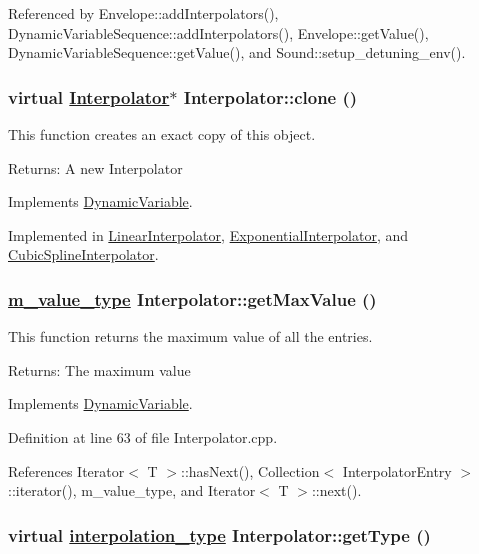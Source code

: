 Referenced by Envelope::add\-Interpolators(), Dynamic\-Variable\-Sequence::add\-Interpolators(), Envelope::get\-Value(), Dynamic\-Variable\-Sequence::get\-Value(), and Sound::setup\_\-detuning\_\-env().\hypertarget{classInterpolator_a1}{
\subsubsection[clone]{\setlength{\rightskip}{0pt plus 5cm}virtual \hyperlink{classInterpolator}{Interpolator}$\ast$ Interpolator::clone ()}}
\label{classInterpolator_a1}


This function creates an exact copy of this object. \begin{Desc}
\item[Returns:]A new Interpolator \end{Desc}


Implements \hyperlink{classDynamicVariable_a2}{Dynamic\-Variable}.

Implemented in \hyperlink{classLinearInterpolator_a1}{Linear\-Interpolator}, \hyperlink{classExponentialInterpolator_a1}{Exponential\-Interpolator}, and \hyperlink{classCubicSplineInterpolator_a1}{Cubic\-Spline\-Interpolator}.\hypertarget{classInterpolator_a5}{
\subsubsection[getMaxValue]{\setlength{\rightskip}{0pt plus 5cm}\hyperlink{Types_8h_a3}{m\_\-value\_\-type} Interpolator::get\-Max\-Value ()}}
\label{classInterpolator_a5}


This function returns the maximum value of all the entries. \begin{Desc}
\item[Returns:]The maximum value \end{Desc}


Implements \hyperlink{classDynamicVariable_a5}{Dynamic\-Variable}.

Definition at line 63 of file Interpolator.cpp.

References Iterator$<$ T $>$::has\-Next(), Collection$<$ Interpolator\-Entry $>$::iterator(), m\_\-value\_\-type, and Iterator$<$ T $>$::next().\hypertarget{classInterpolator_a6}{
\subsubsection[getType]{\setlength{\rightskip}{0pt plus 5cm}virtual \hyperlink{Types_8h_a13}{interpolation\_\-type} Interpolator::get\-Type ()}}
\label{classInterpolator_a6}


